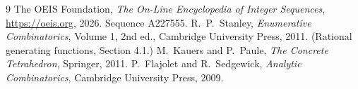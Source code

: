 \documentclass[11pt,a4paper]{article}
\theoremstyle{plain}
\theoremstyle{definition}
\begin{document}
\begin{thebibliography}{9}
 The OEIS Foundation, \emph{The On-Line Encyclopedia of Integer
Sequences}, \url{https://oeis.org}, 2026. Sequence A227555.
 R.~P.~Stanley, \emph{Enumerative Combinatorics}, Volume 1, 2nd ed.,
Cambridge University Press, 2011. (Rational generating functions, Section 4.1.)
 M.~Kauers and P.~Paule, \emph{The Concrete Tetrahedron}, Springer, 2011.
 P.~Flajolet and R.~Sedgewick, \emph{Analytic Combinatorics}, Cambridge
University Press, 2009.
\end{thebibliography}
\end{document}
